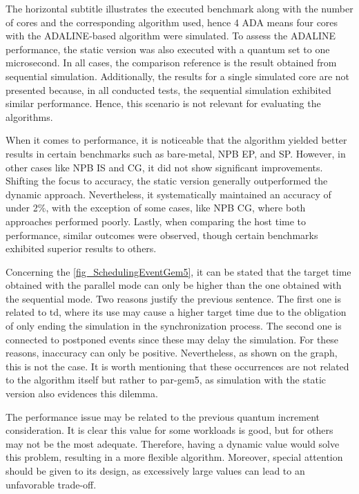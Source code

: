 The horizontal subtitle illustrates the executed benchmark along with the number of cores and the corresponding algorithm used, hence 4 ADA 
means four cores with the ADALINE-based algorithm were simulated. To assess the ADALINE performance, the static version was also executed with 
a quantum set to one microsecond. In all cases, the comparison reference is the result obtained from sequential simulation. Additionally, the 
results for a single simulated core are not presented because, in all conducted tests, the sequential simulation exhibited similar performance. 
Hence, this scenario is not relevant for evaluating the algorithms.

When it comes to performance, it is noticeable that the algorithm yielded better results in certain benchmarks such as bare-metal, NPB EP, and SP. 
However, in other cases like NPB IS and CG, it did not show significant improvements. Shifting the focus to accuracy, the static version generally 
outperformed the dynamic approach. Nevertheless, it systematically maintained an accuracy of under 2\%, with the exception of some cases, like
NPB CG, where both approaches performed poorly. Lastly, when comparing the host time to performance, similar outcomes were observed, though 
certain benchmarks exhibited superior results to others.

Concerning the \autoref{fig_SchedulingEventGem5}, it can be stated that the target time obtained with the parallel mode can only 
be higher than the one obtained with the sequential mode. Two reasons justify the previous sentence. The first one is related to 
\gls{td}, where its use may cause a higher target time due to the obligation of only ending the simulation in the synchronization process. 
The second one is connected to postponed events since these may delay the simulation. For these reasons, inaccuracy can only be positive.
Nevertheless, as shown on the graph, this is not the case. It is worth mentioning that these occurrences are not related to 
the algorithm itself but rather to par-gem5, as simulation with the static version also evidences this dilemma.

The performance issue may be related to the previous quantum increment consideration. It is clear this value for some workloads is good, but 
for others may not be the most adequate. Therefore, having a dynamic value would solve this problem, resulting in a more flexible algorithm. 
Moreover, special attention should be given to its design, as excessively large values can lead to an unfavorable trade-off.


